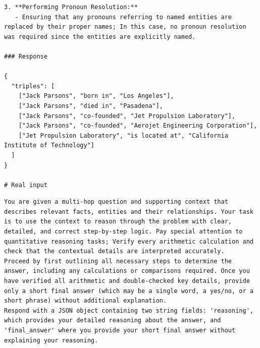 \documentclass{article}
\begin{document}
\begin{lstlisting}[style=promptstyle, caption={RE prompt},label={lst:re}]
3. **Performing Pronoun Resolution:**  
   - Ensuring that any pronouns referring to named entities are replaced by their proper names; In this case, no pronoun resolution was required since the entities are explicitly named.

### Response

{
  "triples": [
    ["Jack Parsons", "born in", "Los Angeles"],
    ["Jack Parsons", "died in", "Pasadena"],
    ["Jack Parsons", "co-founded", "Jet Propulsion Laboratory"],
    ["Jack Parsons", "co-founded", "Aerojet Engineering Corporation"],
    ["Jet Propulsion Laboratory", "is located at", "California Institute of Technology"]
  ]
}

# Real input
\end{lstlisting}


\begin{lstlisting}[style=promptstyle, caption={Answering prompt for SA-RAG},label={lst:answering_sa}]
You are given a multi-hop question and supporting context that describes relevant facts, entities and their relationships. Your task is to use the context to reason through the problem with clear, detailed, and correct step-by-step logic. Pay special attention to quantitative reasoning tasks; Verify every arithmetic calculation and check that the contextual details are interpreted accurately.
Proceed by first outlining all necessary steps to determine the answer, including any calculations or comparisons required. Once you have verified all arithmetic and double-checked key details, provide only a short final answer (which may be a single word, a yes/no, or a short phrase) without additional explanation.
Respond with a JSON object containing two string fields: 'reasoning', which provides your detailed reasoning about the answer, and 'final_answer' where you provide your short final answer without explaining your reasoning.
\end{lstlisting}
\end{document}
